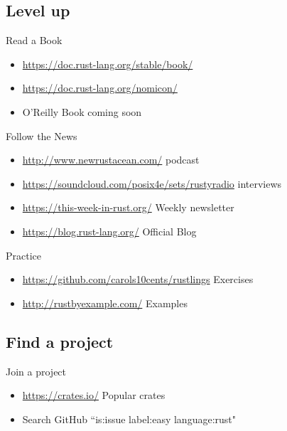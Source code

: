 \documentclass[50pt]{beamer}
\begin{document}
\subsection{Level up}

\begin{frame}
    Read a Book
    \begin{itemize}
        \item \url{https://doc.rust-lang.org/stable/book/}
        \item \url{https://doc.rust-lang.org/nomicon/}
        \item O'Reilly Book coming soon
    \end{itemize}
\end{frame}

\begin{frame}
    Follow the News
    \begin{itemize}
        \item \url{http://www.newrustacean.com/} podcast
        \item \url{https://soundcloud.com/posix4e/sets/rustyradio} interviews
        \item \url{https://this-week-in-rust.org/} Weekly newsletter
        \item \url{https://blog.rust-lang.org/} Official Blog
    \end{itemize}
\end{frame}

\begin{frame}
    Practice
    \begin{itemize}
        \item \url{https://github.com/carols10cents/rustlings} Exercises
        \item \url{http://rustbyexample.com/} Examples
    \end{itemize}
\end{frame}

\subsection{Find a project}

\begin{frame}
    Join a project
    \begin{itemize}
        \item \url{https://crates.io/} Popular crates
        \item Search GitHub ``is:issue label:easy language:rust"
    \end{itemize}
\end{frame}
\end{document}

